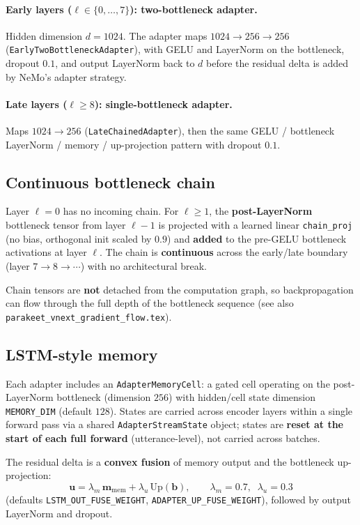 \documentclass[11pt,a4paper]{article}
\begin{document}
\paragraph{Early layers ($\ell \in \{0,\ldots,7\}$): two-bottleneck adapter.}
Hidden dimension $d=1024$. The adapter maps $1024 \rightarrow 256 \rightarrow 256$ (\texttt{EarlyTwoBottleneckAdapter}), with GELU and LayerNorm on the bottleneck, dropout $0.1$, and output LayerNorm back to $d$ before the residual delta is added by NeMo's adapter strategy.

\paragraph{Late layers ($\ell \geq 8$): single-bottleneck adapter.}
Maps $1024 \rightarrow 256$ (\texttt{LateChainedAdapter}), then the same GELU / bottleneck LayerNorm / memory / up-projection pattern with dropout $0.1$.

\subsection{Continuous bottleneck chain}
Layer $\ell=0$ has no incoming chain. For $\ell \geq 1$, the \textbf{post-LayerNorm} bottleneck tensor from layer $\ell-1$ is projected with a learned linear \texttt{chain\_proj} (no bias, orthogonal init scaled by $0.9$) and \textbf{added} to the pre-GELU bottleneck activations at layer $\ell$. The chain is \textbf{continuous} across the early/late boundary (layer $7 \rightarrow 8 \rightarrow \cdots$) with no architectural break.

Chain tensors are \textbf{not} detached from the computation graph, so backpropagation can flow through the full depth of the bottleneck sequence (see also \texttt{parakeet\_vnext\_gradient\_flow.tex}).

\subsection{LSTM-style memory}
Each adapter includes an \texttt{AdapterMemoryCell}: a gated cell operating on the post-LayerNorm bottleneck (dimension $256$) with hidden/cell state dimension \texttt{MEMORY\_DIM} (default $128$). States are carried across encoder layers within a single forward pass via a shared \texttt{AdapterStreamState} object; states are \textbf{reset at the start of each full forward} (utterance-level), not carried across batches.

The residual delta is a \textbf{convex fusion} of memory output and the bottleneck up-projection:
\[
\bm{u} = \lambda_m \, \bm{m}_{\mathrm{mem}} + \lambda_u \, \mathrm{Up}(\bm{b}),
\qquad
\lambda_m = 0.7,\;\; \lambda_u = 0.3
\]
(defaults \texttt{LSTM\_OUT\_FUSE\_WEIGHT}, \texttt{ADAPTER\_UP\_FUSE\_WEIGHT}), followed by output LayerNorm and dropout.
\end{document}
